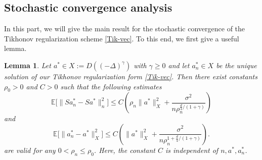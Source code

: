\documentclass[11pt]{article}
\newtheorem{lemma}{Lemma}[section]
\numberwithin{equation}{section}
\begin{document}
\subsection{Stochastic convergence analysis}
In this part, we will give the main result for the stochastic convergence of the Tikhonov regularization scheme \eqref{Tik-vec}. To this end, we first give a useful lemma.
\begin{lemma}\label{lem-Ean-Ea*}
Let $a^*\in X:=D((-\Delta)^\gamma)$ with $\gamma\ge0$ and let $a_n^* \in X$ be the unique solution of our Tikhonov regularization form \eqref{Tik-vec}. Then there exist constants $ \rho_0 > 0 $ and $ C > 0 $ such that the following estimates
\[
\mathbb{E} \bigl[ \| S a_n^* - S a^* \|^2_n \bigr] \leq C \left( \rho_n \| a^* \|^2_X +  \frac{\sigma^2}{n \rho_n^{\frac{d}4/(1+\gamma)}} \right)
\]
and
\[
\mathbb{E} \bigl[ \| a_n^* - a^* \|^2_{X} \bigr] \leq C \left( \| a^* \|^2_X + \frac{\sigma^2}{n \rho_n^{1 + \frac{d}4/(1+\gamma)}}\right).
\]
are valid for any $0< \rho_n \leq \rho_0 $. Here, the constant $C$ is independent of $n,a^*,a_n^*$.
\end{lemma}
\end{document}
